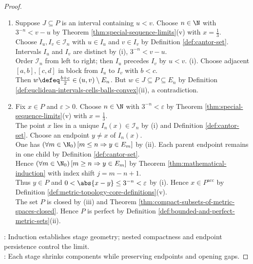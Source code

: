 \begin{proposition}
\begin{proof}
\begin{enumerate}[label=(\roman*)]
Hence $E_n$ is closed by Theorem \ref{thm:metric-open-closed-set-calculus}(iv). The inclusion $E_n\subseteq E_0=[0,1]$ holds by (ii), so $E_n$ is bounded.\\
Hence $E_n$ is compact by Theorem \ref{thm:heine-borel-rk}, direction $(i)\Rightarrow(ii)$. Since $E_1\subseteq E_0$, $P=\bigcap\limits_{n=1}^{\infty}E_n\neq\emptyset$ by Corollary \ref{cor:nested-nonempty-compact-intersection}.\\
The set $P$ is closed by Theorem \ref{thm:metric-open-closed-set-calculus}(ii). Since $P\subseteq E_0$ and $E_0$ is compact, $P$ is compact by Theorem \ref{thm:closed-subsets-of-compact-sets-compact}.
\item Suppose $J\subseteq P$ is an interval containing $u<v$. Choose $n\in\N$ with $3^{-n}<v-u$ by Theorem \ref{thm:special-sequence-limits}(v) with $x=\frac13$.\\
Choose $I_u,I_v\in\mathcal{I}_n$ with $u\in I_u$ and $v\in I_v$ by Definition \ref{def:cantor-set}. Intervals $I_u$ and $I_v$ are distinct by (i), $3^{-n}<v-u$.\\
Order $\mathcal{I}_n$ from left to right; then $I_u$ precedes $I_v$ by $u<v$. (i). Choose adjacent $[a,b],[c,d]$ in block from $I_u$ to $I_v$ with $b<c$.\\
Then $w\defeq\frac{b+c}{2}\in(u,v)\setminus E_n$. But $w\in J\subseteq P\subseteq E_n$ by Definition \ref{def:euclidean-intervals-cells-balls-convex}(ii), a contradiction.
\item Fix $x\in P$ and $\varepsilon>0$. Choose $n\in\N$ with $3^{-n}<\varepsilon$ by Theorem \ref{thm:special-sequence-limits}(v) with $x=\frac13$.\\
The point $x$ lies in a unique $I_n(x)\in\mathcal{I}_n$ by (i) and Definition \ref{def:cantor-set}. Choose an endpoint $y\neq x$ of $I_n(x)$.\\
One has $(\forall m\in\N_0)\,[m\leq n\Rightarrow y\in E_m]$ by (ii). Each parent endpoint remains in one child by Definition \ref{def:cantor-set}.\\
Hence $(\forall m\in\N_0)\,[m\geq n\Rightarrow y\in E_m]$ by Theorem \ref{thm:mathematical-induction} with index shift $j=m-n+1$.\\
Thus $y\in P$ and $0<\abs{x-y}\leq3^{-n}<\varepsilon$ by (i). Hence $x\in P^{\operatorname{acc}}$ by Definition \ref{def:metric-topology-core-definitions}(v).\\
The set $P$ is closed by (iii) and Theorem \ref{thm:compact-subsets-of-metric-spaces-closed}. Hence $P$ is perfect by Definition \ref{def:bounded-and-perfect-metric-sets}(ii).
\end{enumerate}
: Induction establishes stage geometry; nested compactness and endpoint persistence control the limit.\\
: Each stage shrinks components while preserving endpoints and opening gaps.
\end{proof}
\end{proposition}
